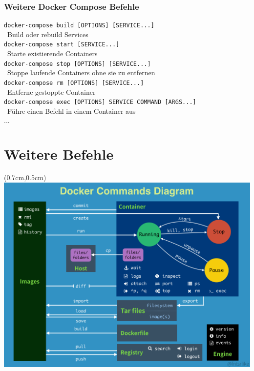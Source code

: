 \documentclass[22pt]{beamer}
\newcommand{\code}[1]{\colorbox{gray!10}{\texttt{#1}}}
\begin{document}
\begin{frame}[fragile]
    \frametitle{Weitere Docker Compose Befehle}
    \code{docker-compose build [OPTIONS] [SERVICE...]}\\
    \-  \ Build oder rebuild Services \\

    \code{docker-compose start [SERVICE...]}\\
    \-  \ Starte existierende Containers \\

    \code{docker-compose stop [OPTIONS] [SERVICE...]}\\
    \-  \ Stoppe laufende Containers ohne sie zu entfernen \\

    \code{docker-compose rm [OPTIONS] [SERVICE...]}\\
    \-  \ Entferne gestoppte Container \\

    \code{docker-compose exec [OPTIONS] SERVICE COMMAND [ARGS...]}\\
    \-  \ Führe einen Befehl in einem Container aus \\

    ...
\end{frame}

\section{Weitere Befehle}
\begin{frame}[t]
    \begin{textblock*}{\paperwidth}(0.7cm,0.5cm) %
        \includegraphics[width=0.9\paperwidth]{Bilder/dockercommand.png}
    \end{textblock*}
\end{frame} 
\end{document}
